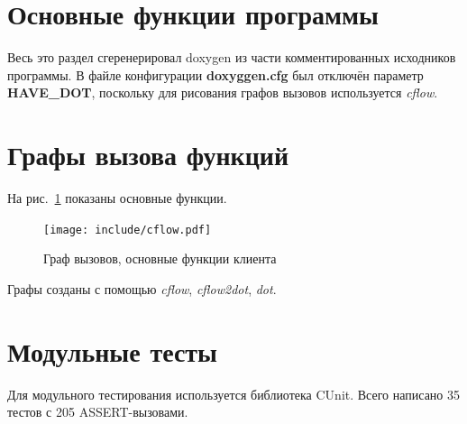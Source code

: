 \documentclass[a4paper,12pt]{report}
\begin{document}


\section{Основные функции программы}

Весь это раздел сгеренерировал doxygen из части комментированных исходников программы.
В файле конфигурации \textbf{doxyggen.cfg} был отключён параметр \textbf{HAVE\_DOT}, поскольку для рисования графов вызовов используется \textit{cflow}.









\section{Графы вызова функций}

На рис.~\ref{fig:cflow01} показаны основные функции.

\begin{figure}[H]
    \centering
    \texttt{[image: include/cflow.pdf]}
    \caption{Граф вызовов, основные функции клиента}
    \label{fig:cflow01}
\end{figure}

Графы созданы с помощью \textit{cflow}, \textit{cflow2dot}, \textit{dot}.

\section{Модульные тесты}
Для модульного тестирования используется библиотека CUnit. Всего написано 35 тестов с 205 ASSERT-вызовами.
\end{document}
